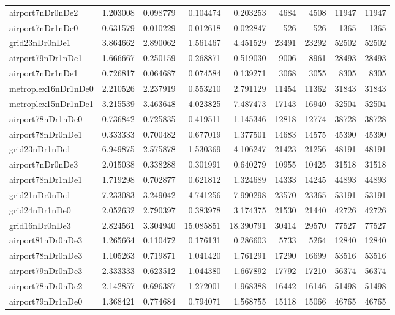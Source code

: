\begin{longtable}{|l|r|r|r|r|r|r|r|r|}
airport7nDr0nDe2 & 1.203008 & 0.098779 & 0.104474 & 0.203253 & 4684 & 4508 & 11947 & 11947 \\
airport7nDr1nDe0 & 0.631579 & 0.010229 & 0.012618 & 0.022847 & 526 & 526 & 1365 & 1365 \\
grid23nDr0nDe1 & 3.864662 & 2.890062 & 1.561467 & 4.451529 & 23491 & 23292 & 52502 & 52502 \\
airport79nDr1nDe1 & 1.666667 & 0.250159 & 0.268871 & 0.519030 & 9006 & 8961 & 28493 & 28493 \\
airport7nDr1nDe1 & 0.726817 & 0.064687 & 0.074584 & 0.139271 & 3068 & 3055 & 8305 & 8305 \\
metroplex16nDr1nDe0 & 2.210526 & 2.237919 & 0.553210 & 2.791129 & 11454 & 11362 & 31843 & 31843 \\
metroplex15nDr1nDe1 & 3.215539 & 3.463648 & 4.023825 & 7.487473 & 17143 & 16940 & 52504 & 52504 \\
airport78nDr1nDe0 & 0.736842 & 0.725835 & 0.419511 & 1.145346 & 12818 & 12774 & 38728 & 38728 \\
airport78nDr0nDe1 & 0.333333 & 0.700482 & 0.677019 & 1.377501 & 14683 & 14575 & 45390 & 45390 \\
grid23nDr1nDe1 & 6.949875 & 2.575878 & 1.530369 & 4.106247 & 21423 & 21256 & 48191 & 48191 \\
airport7nDr0nDe3 & 2.015038 & 0.338288 & 0.301991 & 0.640279 & 10955 & 10425 & 31518 & 31518 \\
airport78nDr1nDe1 & 1.719298 & 0.702877 & 0.621812 & 1.324689 & 14333 & 14245 & 44893 & 44893 \\
grid21nDr0nDe1 & 7.233083 & 3.249042 & 4.741256 & 7.990298 & 23570 & 23365 & 53191 & 53191 \\
grid24nDr1nDe0 & 2.052632 & 2.790397 & 0.383978 & 3.174375 & 21530 & 21440 & 42726 & 42726 \\
grid16nDr0nDe3 & 2.824561 & 3.304940 & 15.085851 & 18.390791 & 30414 & 29570 & 77527 & 77527 \\
airport81nDr0nDe3 & 1.265664 & 0.110472 & 0.176131 & 0.286603 & 5733 & 5264 & 12840 & 12840 \\
airport78nDr0nDe3 & 1.105263 & 0.719871 & 1.041420 & 1.761291 & 17290 & 16699 & 53516 & 53516 \\
airport79nDr0nDe3 & 2.333333 & 0.623512 & 1.044380 & 1.667892 & 17792 & 17210 & 56374 & 56374 \\
airport78nDr0nDe2 & 2.142857 & 0.696387 & 1.272001 & 1.968388 & 16442 & 16146 & 51498 & 51498 \\
airport79nDr1nDe0 & 1.368421 & 0.774684 & 0.794071 & 1.568755 & 15118 & 15066 & 46765 & 46765 \\

\end{longtable}
